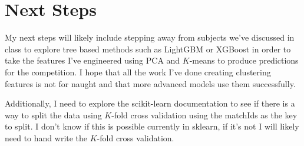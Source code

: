 \documentclass[11pt]{article}
\begin{document}
\section{Next Steps}

My next steps will likely include stepping away from subjects we've discussed in class to explore tree based methods such as
LightGBM or XGBoost in order to take the features I've engineered using PCA and $K$-means to produce predictions for the competition.
I hope that all the work I've done creating clustering features is not for naught and that more advanced models use them 
successfully.

Additionally, I need to explore the scikit-learn documentation to see if there is a way to split the data using $K$-fold cross
validation using the matchIds as the key to split. I don't know if this is possible currently in sklearn, if it's not I will
likely need to hand write the $K$-fold cross validation.

\printbibliography
\end{document}
